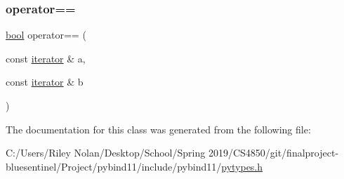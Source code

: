 \mbox{\label{classiterator_a81d10d7799462c7ca5e7cf19119ca356}} 
\subsubsection{\texorpdfstring{operator==}{operator==}}
{\footnotesize\ttfamily \mbox{\hyperlink{asdl_8h_af6a258d8f3ee5206d682d799316314b1}{bool}} operator== (\begin{DoxyParamCaption}\item[{const \mbox{\hyperlink{classiterator}{iterator}} \&}]{a,  }\item[{const \mbox{\hyperlink{classiterator}{iterator}} \&}]{b }\end{DoxyParamCaption})\hspace{0.3cm}{\ttfamily [friend]}}



The documentation for this class was generated from the following file\+:\begin{DoxyCompactItemize}
\item 
C\+:/\+Users/\+Riley Nolan/\+Desktop/\+School/\+Spring 2019/\+C\+S4850/git/finalproject-\/bluesentinel/\+Project/pybind11/include/pybind11/\mbox{\hyperlink{pytypes_8h}{pytypes.\+h}}\end{DoxyCompactItemize}
